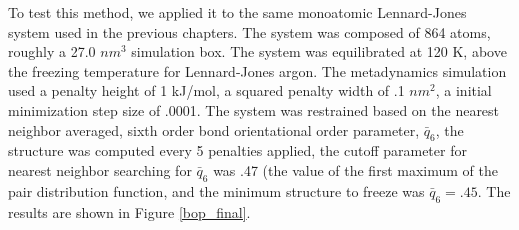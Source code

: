 To test this method, we applied it to the same monoatomic Lennard-Jones system used in the previous chapters.  The system was composed of 864 atoms, roughly a 27.0 $nm^3$ simulation box.  The system was equilibrated at 120 K, above the freezing temperature for Lennard-Jones argon.  The metadynamics simulation used a penalty height of 1 kJ/mol, a squared penalty width of .1 $nm^2$, a initial minimization step size of .0001.  The system was restrained based on the nearest neighbor averaged, sixth order bond orientational order parameter, $\bar{q}_6$, the structure was computed every 5 penalties applied, the cutoff parameter for nearest neighbor searching for $\bar{q}_6$ was .47 (the value of the first maximum of the pair distribution function, and the minimum structure to freeze was $\bar{q}_6 = .45$.  The results are shown in Figure \ref{bop_final}. 

